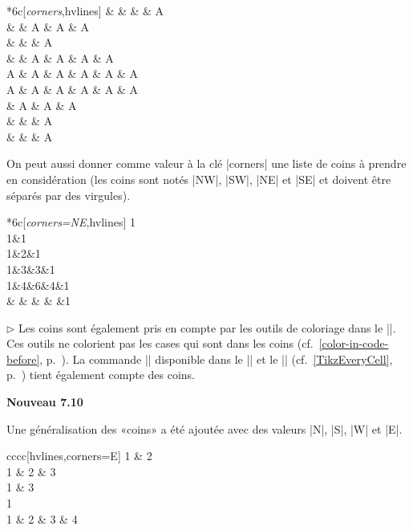 \documentclass[dvipsnames]{article}
\begin{document}
\medskip
\begin{Code}[width=11cm,show-output]
\begin{NiceTabular}{*{6}{c}}[\emph{corners},hvlines]
  &   &   &   & A \\
  &   & A & A & A \\
  &   &   & A \\
  &   & A & A & A & A \\
A & A & A & A & A & A \\
A & A & A & A & A & A \\
  & A & A & A \\
  &  & & A \\
  &   &   & A \\
\end{NiceTabular}
\end{Code}

\vspace{1cm}
On peut aussi donner comme valeur à la clé |corners| une liste de coins à
prendre en considération (les coins sont notés |NW|, |SW|, |NE| et |SE| et
doivent être séparés par des virgules).

\medskip
\begin{Code}[width=11cm,show-output]
\begin{NiceTabular}{*{6}{c}}[\emph{corners=NE},hvlines]
1\\
1&1\\
1&2&1\\
1&3&3&1\\
1&4&6&4&1\\
 & & & & &1
\end{NiceTabular}
\end{Code}


\bigskip
$\triangleright$ Les coins sont également pris en compte par les outils de
coloriage dans le |\CodeBefore|. Ces outils ne colorient pas les cases qui sont
dans les coins (cf.~\ref{color-in-code-before},
p.~\pageref{color-in-code-before}). La commande |\TikzEveryCell| disponible dans
le |\CodeAfter| et le |\CodeBefore| (cf.~\ref{TikzEveryCell},
p.~\pageref{TikzEveryCell}) tient également compte des coins.


\clearpage
\bigskip
\colorbox{yellow!50}{\bfseries Nouveau 7.10}

\smallskip
\nobreak
Une généralisation des «coins» a été ajoutée avec des valeurs |N|, |S|, |W| et |E|.

\medskip
\begin{Code}[width=11cm,show-output]
\begin{NiceTabular}{cccc}[hvlines,corners=E]
1 & 2 \\
1 & 2 & 3 \\
1 & 3 \\
1 \\
1 & 2 & 3 & 4 \\
\end{NiceTabular}
\end{Code}
\end{document}
